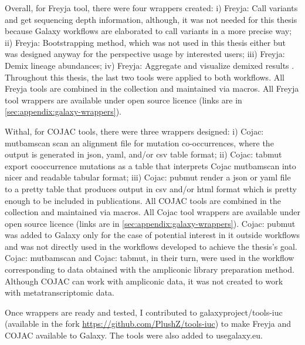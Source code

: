             Overall, for Freyja tool, there were four wrappers created: i) Freyja: Call variants and get sequencing depth information, although, it was not needed for this thesis because Galaxy workflows are elaborated to call variants in a more precise way; ii) Freyja: Bootstrapping method, which was not used in this thesis either but was designed anyway for the perspective usage by interested users; iii) Freyja: Demix lineage abundances; iv) Freyja: Aggregate and visualize demixed results . Throughout this thesis, the last two tools were applied to both workflows. All Freyja tools are combined in the collection and maintained via macros. All Freyja tool wrappers are available under open source licence (links are in \cref{sec:appendix:galaxy-wrappers}).
            
            Withal, for COJAC tools, there were three wrappers designed: i) Cojac: mutbamscan scan an alignment file for mutation co-occurrences, where the output is generated in \acrshort{json}, \acrshort{yaml}, and/or \acrshort{csv} table format; ii) Cojac: tabmut export cooccurrence mutations as a table that interprets Cojac mutbamscan into nicer and readable tabular format; iii) Cojac: pubmut render a \acrshort{json} or \acrshort{yaml} file to a pretty table that produces output in \acrshort{csv} and/or \acrshort{html} format which is pretty enough to be included in publications. All COJAC tools are combined in the collection and maintained via macros. All Cojac tool wrappers are available under open source licence (links are in \cref{sec:appendix:galaxy-wrappers}). Cojac: pubmut was added to Galaxy only for the case of potential interest in it outside workflows and was not directly used in the workflows developed to achieve the thesis's goal. Cojac: mutbamscan and Cojac: tabmut, in their turn, were used in the workflow corresponding to data obtained with the ampliconic library preparation method. Although COJAC can work with ampliconic data, it was not created to work with metatranscriptomic data. 
            
            Once wrappers are ready and tested, I contributed to galaxyproject/tools-iuc (available in the fork \url{https://github.com/PlushZ/tools-iuc}) to make Freyja and COJAC available to Galaxy. The tools were also added to usegalaxy.eu. 
            
